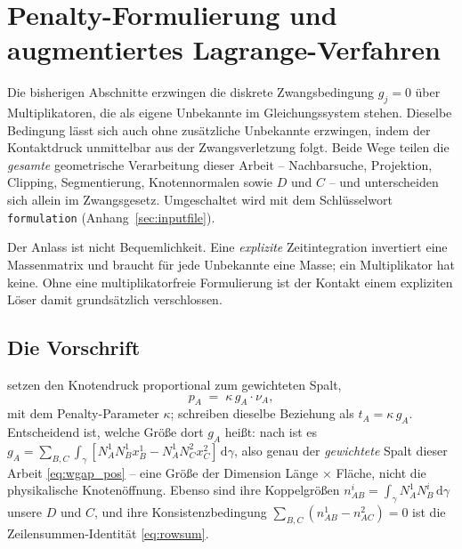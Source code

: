 \documentclass[a4paper,11pt]{article}
\def\bm#1{#1}%
\def\tilde#1{#1}%
\newcommand{\code}[1]{\texttt{\small #1}}
\let\stdsection\section
\renewcommand{\section}{\clearpage\stdsection}
\begin{document}
\section{Penalty-Formulierung und augmentiertes Lagrange-Verfahren}
\label{sec:penalty}

Die bisherigen Abschnitte erzwingen die diskrete Zwangsbedingung $\tilde g_j=0$ über
Multiplikatoren, die als eigene Unbekannte im Gleichungssystem stehen. Dieselbe Bedingung lässt
sich auch ohne zusätzliche Unbekannte erzwingen, indem der Kontaktdruck unmittelbar aus der
Zwangsverletzung folgt. Beide Wege teilen die \emph{gesamte} geometrische Verarbeitung dieser
Arbeit -- Nachbarsuche, Projektion, Clipping, Segmentierung, Knotennormalen sowie $\bm D$ und
$\bm C$ -- und unterscheiden sich allein im Zwangsgesetz. Umgeschaltet wird mit dem Schlüsselwort
\code{formulation} (Anhang~\ref{sec:inputfile}).

Der Anlass ist nicht Bequemlichkeit. Eine \emph{explizite} Zeitintegration invertiert eine
Massenmatrix und braucht für jede Unbekannte eine Masse; ein Multiplikator hat keine. Ohne eine
multiplikatorfreie Formulierung ist der Kontakt einem expliziten Löser damit grundsätzlich
verschlossen.

\subsection{Die Vorschrift}
\label{sec:penaltylaw}

\citet[Gl.~(24)]{puso2004} setzen den Knotendruck proportional zum gewichteten Spalt,
\begin{equation}
p_A \;=\; \kappa\,\bm g_A\cdot\bm\nu_A ,
\label{eq:penaltylaw}
\end{equation}
mit dem Penalty-Parameter $\kappa$; \citet[Gl.~(7)]{puso2008} schreiben dieselbe Beziehung als
$t_A=\kappa\,g_A$. Entscheidend ist, welche Größe dort $g_A$ heißt: nach
\citet[Gl.~(6)]{puso2004} ist es
$\bm g_A=\sum_{B,C}\int_\gamma[N^1_AN^1_B\bm x^1_B-N^1_AN^2_C\bm x^2_C]\,\mathrm d\gamma$, also
genau der \emph{gewichtete} Spalt dieser Arbeit \eqref{eq:wgap_pos} -- eine Größe der Dimension
Länge $\times$ Fläche, nicht die physikalische Knotenöffnung. Ebenso sind ihre Koppelgrößen
$n^i_{AB}=\int_\gamma N^1_AN^i_B\,\mathrm d\gamma$ \citep[Gl.~(13)]{puso2004} unsere $\bm D$ und
$\bm C$, und ihre Konsistenzbedingung $\sum_{B,C}(n^1_{AB}-n^2_{AC})=0$
\citep[Gl.~(15)]{puso2004} ist die Zeilensummen-Identität \eqref{eq:rowsum}.
\end{document}
